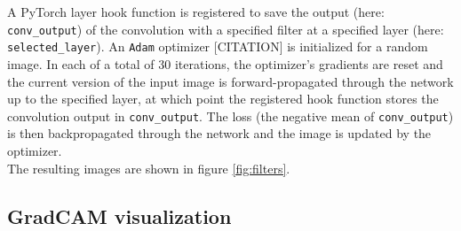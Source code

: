 \documentclass[a4paper]{article}
\begin{document}
A PyTorch layer hook function is registered to save the output (here: \texttt{conv\_output}) of the convolution with a specified filter at a specified layer (here: \texttt{selected\_layer}). An \texttt{Adam} optimizer [CITATION] is initialized for a random image. In each of a total of 30 iterations, the optimizer's gradients are reset and the current version of the input image is forward-propagated through the network up to the specified layer, at which point the registered hook function stores the convolution output in \texttt{conv\_output}. The loss (the negative mean of \texttt{conv\_output}) is then backpropagated through the network and the image is updated by the optimizer.\\
The resulting images are shown in figure \ref{fig:filters}.

\subsection{GradCAM visualization}
\label{sec:gradcam}
\end{document}
